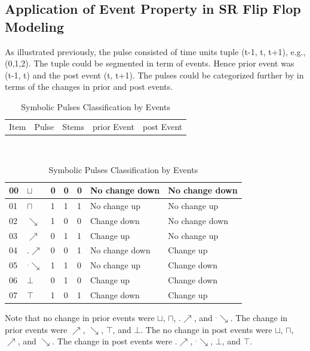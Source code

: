 \documentclass[10pt,journal]{IEEEtran}
\begin{document}
\subsection{Application of Event Property in SR Flip Flop Modeling}
As illustrated previously, the pulse consisted of time units tuple    (t-1, t, t+1), e.g., (0,1,2). The tuple could be segmented in term of     events. Hence prior event was (t-1, t) and the post event (t, t+1).     The pulses could be categorized further by in terms of the changes in     prior and post events.
\begin{table}[H] \caption{Symbolic Pulses Classification by Events}     \centering                                                               \begin{tabular}{|p{.4cm}|p{.5cm}|p{1.17cm}|p{2cm}|p{2cm}|}               \hline Item&Pulse &Stems&prior Event&post Event                      \\ \end{tabular}                                                        \\ \begin{tabular}{|p{.4cm}|p{.5cm}|p{.1cm}|p{.1cm}|p{.1cm}|p{2cm}|p{2cm}|} \hline 00&$\sqcup$ &0&0&0&No change down&No change down \\ \hline 01&$\sqcap$ &1&1&1&No change up  &No change up   \\ \hline 02&$\searrow$ &1&0&0&   Change down&No change down \\ \hline 03&$\nearrow$ &0&1&1&   Change up  &No change up   \\ \hline 04&$.\nearrow$ &0&0&1&No change down&   Change up   \\ \hline 05&$^.\searrow$ &1&1&0&No change up  &   Change down \\ \hline 06&$\bot$ &0&1&0&   Change up  &   Change down \\ \hline 07&$\top$ &1&0&1&   Change down&   Change up   \\ \hline \end{tabular} \end{table} 
Note that no change in prior events were $\sqcup$, $\sqcap$, $.\nearrow$, and $^.\searrow$. The change in prior events were $\nearrow$, $\searrow$, $\top$, and $\bot$. The no change in post events were $\sqcup$, $\sqcap$, $\nearrow$, and $\searrow$. The change in post events were $.\nearrow$, $^.\searrow$, $\bot$, and $\top$. \\ \ \\      
\end{document}
